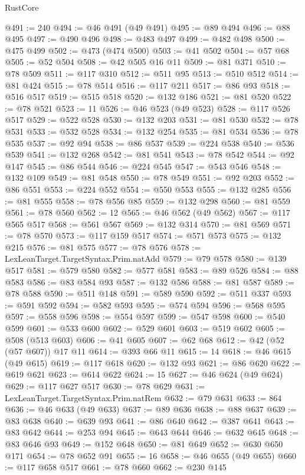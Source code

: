 \begin{lexlean}{RustCore}
\begin{coremodule}
@491 := 240
@494 := @46 @491 (@49 @491)
@495 := @89 @494
@496 := @88 @495
@497 := @490 @496
@498 := @483 @497
@499 := @482 @498
@500 := @475 @499
@502 := @473 (@474 @500)
@503 := @41 @502
@504 := @57 @68
@505 := @52 @504
@508 := @42 @505 @16 @11
@509 := @81 @371
@510 := @78 @509
@511 := @117 @310
@512 := @511 @95
@513 := @510 @512
@514 := @81 @424
@515 := @78 @514
@516 := @117 @211
@517 := @86 @93
@518 := @516 @517
@519 := @515 @518
@520 := @132 @186
@521 := @81 @520
@522 := @78 @521
@523 := 11
@526 := @46 @523 (@49 @523)
@528 := @117 @526 @517
@529 := @522 @528
@530 := @132 @203
@531 := @81 @530
@532 := @78 @531
@533 := @532 @528
@534 := @132 @254
@535 := @81 @534
@536 := @78 @535
@537 := @92 @94
@538 := @86 @537
@539 := @224 @538
@540 := @536 @539
@541 := @132 @268
@542 := @81 @541
@543 := @78 @542
@544 := @92 @147
@545 := @86 @544
@546 := @224 @545
@547 := @543 @546
@548 := @132 @109
@549 := @81 @548
@550 := @78 @549
@551 := @92 @203
@552 := @86 @551
@553 := @224 @552
@554 := @550 @553
@555 := @132 @285
@556 := @81 @555
@558 := @78 @556 @85
@559 := @132 @298
@560 := @81 @559
@561 := @78 @560
@562 := 12
@565 := @46 @562 (@49 @562)
@567 := @117 @565 @517
@568 := @561 @567
@569 := @132 @314
@570 := @81 @569
@571 := @78 @570
@573 := @117 @159 @517
@574 := @571 @573
@575 := @132 @215
@576 := @81 @575
@577 := @78 @576
@578 := LexLeanTarget.TargetSyntax.Prim.natAdd
@579 := @79 @578
@580 := @139 @517
@581 := @579 @580
@582 := @577 @581
@583 := @89 @526
@584 := @88 @583
@586 := @83 @584 @93
@587 := @132 @586
@588 := @81 @587
@589 := @78 @588
@590 := @511 @148
@591 := @589 @590
@592 := @511 @337
@593 := @591 @592
@594 := @582 @593
@595 := @574 @594
@596 := @568 @595
@597 := @558 @596
@598 := @554 @597
@599 := @547 @598
@600 := @540 @599
@601 := @533 @600
@602 := @529 @601
@603 := @519 @602
@605 := @508 (@513 @603)
@606 := @41 @605
@607 := @62 @68
@612 := @42 (@52 (@57 @607)) @17 @11
@614 := @393 @66 @11
@615 := 14
@618 := @46 @615 (@49 @615)
@619 := @117 @618
@620 := @132 @93
@621 := @86 @620
@622 := @619 @621
@623 := @614 @622
@624 := 15
@627 := @46 @624 (@49 @624)
@629 := @117 @627 @517
@630 := @78 @629
@631 := LexLeanTarget.TargetSyntax.Prim.natRem
@632 := @79 @631
@633 := 864
@636 := @46 @633 (@49 @633)
@637 := @89 @636
@638 := @88 @637
@639 := @83 @638
@640 := @639 @93
@641 := @86 @640
@642 := @387 @641
@643 := @83 @642
@644 := @253 @94
@645 := @643 @644
@646 := @632 @645
@648 := @83 @646 @93
@649 := @152 @648
@650 := @81 @649
@652 := @630 @650 @171
@654 := @78 @652 @91
@655 := 16
@658 := @46 @655 (@49 @655)
@660 := @117 @658 @517
@661 := @78 @660
@662 := @230 @145

\end{coremodule}
\end{lexlean}
